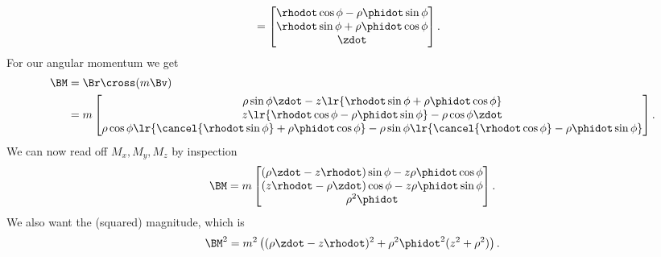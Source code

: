 {\begin{equation}
\begin{aligned}
&=
\begin{bmatrix}
\rhodot \cos\phi - \rho \phidot \sin\phi \\
\rhodot \sin\phi + \rho \phidot \cos\phi \\
\zdot
\end{bmatrix}.
\end{aligned}
\end{equation}
%
For our angular momentum we get
%
\begin{equation}\label{eqn:classicalMechanicsPs2:1130}
\begin{aligned}
\BM
&= \Br \cross (m \Bv) \\
&=
m
\begin{bmatrix}
\rho\sin\phi \zdot - z \lr{ \rhodot \sin\phi + \rho \phidot \cos\phi } \\
z \lr{ \rhodot \cos\phi - \rho \phidot \sin\phi } - \rho \cos\phi \zdot \\
\rho \cos\phi \lr{ \cancel{\rhodot \sin\phi} + \rho \phidot \cos\phi }
 - \rho\sin\phi \lr{ \cancel{\rhodot \cos\phi} - \rho \phidot \sin\phi }
\end{bmatrix} .
\end{aligned}
\end{equation}
%
We can now read off \(M_x, M_y, M_z\) by inspection
%
\begin{equation}\label{eqn:classicalMechanicsPs2:150}
\BM =
m
\begin{bmatrix}
(\rho \zdot
- z \rhodot )\sin\phi
- z \rho \phidot \cos\phi
\\
( z \rhodot
- \rho \zdot ) \cos\phi
- z \rho \phidot \sin\phi
\\
\rho^2 \phidot
\end{bmatrix}.
\end{equation}
%
We also want the (squared) magnitude, which is
%
\begin{equation}\label{eqn:classicalMechanicsPs2:170}
\BM^2
=
m^2 \left(
(\rho \zdot - z \rhodot )^2
+ \rho^2 \phidot^2 ( z^2 + \rho^2 )
\right).
\end{equation}
}
%
